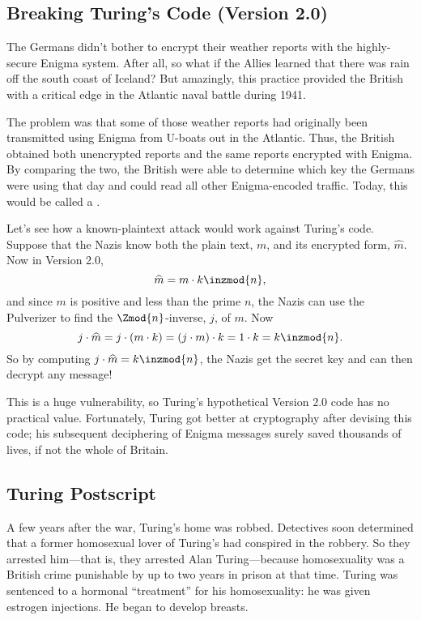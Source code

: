 \subsection{Breaking Turing's Code (Version 2.0)}

The Germans didn't bother to encrypt their weather reports with the
highly-secure Enigma system.  After all, so what if the Allies learned
that there was rain off the south coast of Iceland?  But amazingly,
this practice provided the British with a critical edge in the
Atlantic naval battle during 1941.

The problem was that some of those weather reports had originally been
transmitted using Enigma from U-boats out in the Atlantic.  Thus, the
British obtained both unencrypted reports and the same reports
encrypted with Enigma.  By comparing the two, the British were able to
determine which key the Germans were using that day and could read all
other Enigma-encoded traffic.  Today, this would be called a
.

Let's see how a known-plaintext attack would work against Turing's
code.  Suppose that the Nazis know both the plain text, $m$, and its
encrypted form, $\widehat{m}$.  Now in Version 2.0,
\[
\widehat{m} = m \cdot k \inzmod{n},
\]
and since $m$ is positive and less than the prime $n$, the Nazis can
use the Pulverizer to find the $\Zmod{n}$-inverse, $j$, of $m$.  Now
\[
j \cdot \widehat{m} = j \cdot (m \cdot k) = (j \cdot m) \cdot k
= 1 \cdot k = k \inzmod{n}.
\]
So by computing $j \cdot \widehat{m} = k \inzmod{n}$, the Nazis get the
secret key and can then decrypt any message!

This is a huge vulnerability, so Turing's hypothetical Version 2.0
code has no practical value.  Fortunately, Turing got better at
cryptography after devising this code; his subsequent deciphering of
Enigma messages surely saved thousands of lives, if not the whole of
Britain.


\subsection{Turing Postscript}

A few years after the war, Turing's home was robbed.  Detectives soon
determined that a former homosexual lover of Turing's had conspired in
the robbery.  So they arrested him---that is, they arrested Alan
Turing---because homosexuality was a British crime punishable by up
to two years in prison at that time.  Turing was sentenced to a
hormonal ``treatment'' for his homosexuality: he was given estrogen
injections.  He began to develop breasts.

